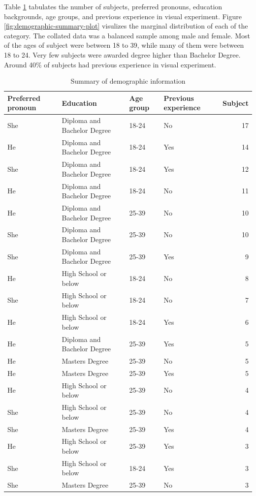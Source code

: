 \documentclass[]{interact}
\theoremstyle{plain}%
\theoremstyle{definition}
\theoremstyle{remark}
\begin{document}
Table \ref{tab:demographic-table} tabulates the number of subjects,
preferred pronouns, education backgrounds, age groups, and previous
experience in visual experiment. Figure
\ref{fig:demographic-summary-plot} visulizes the marginal distribution
of each of the category. The collated data was a balanced sample among
male and female. Most of the ages of subject were between 18 to 39,
while many of them were between 18 to 24. Very few subjects were awarded
degree higher than Bachelor Degree. Around 40\% of subjects had previous
experience in visual experiment.

\begin{table}

\caption{\label{tab:demographic-table}Summary of demographic information}
\centering
\begin{tabular}[t]{llllr}
\toprule
Preferred pronoun & Education & Age group & Previous experience & Subject\\
\midrule
She & Diploma and Bachelor Degree & 18-24 & No & 17\\
He & Diploma and Bachelor Degree & 18-24 & Yes & 14\\
She & Diploma and Bachelor Degree & 18-24 & Yes & 12\\
He & Diploma and Bachelor Degree & 18-24 & No & 11\\
He & Diploma and Bachelor Degree & 25-39 & No & 10\\
She & Diploma and Bachelor Degree & 25-39 & No & 10\\
She & Diploma and Bachelor Degree & 25-39 & Yes & 9\\
He & High School or below & 18-24 & No & 8\\
She & High School or below & 18-24 & No & 7\\
He & High School or below & 18-24 & Yes & 6\\
He & Diploma and Bachelor Degree & 25-39 & Yes & 5\\
He & Masters Degree & 25-39 & No & 5\\
He & Masters Degree & 25-39 & Yes & 5\\
He & High School or below & 25-39 & No & 4\\
She & High School or below & 25-39 & No & 4\\
She & Masters Degree & 25-39 & Yes & 4\\
He & High School or below & 25-39 & Yes & 3\\
She & High School or below & 18-24 & Yes & 3\\
She & Masters Degree & 25-39 & No & 3\\

\end{tabular}
\end{table}
\end{document}
